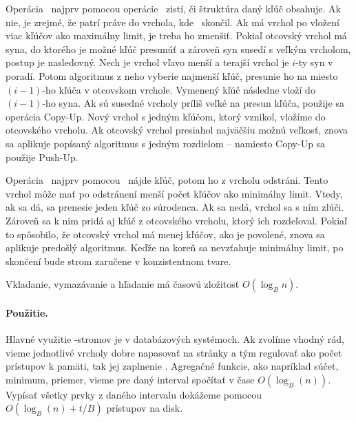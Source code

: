 Operácia \ins\ najprv pomocou operácie \find\ zistí, či štruktúra daný kľúč obsahuje.
Ak nie, je zrejmé, že patrí práve do vrchola, kde \find\ skončil. Ak má vrchol po vložení
viac kľúčov ako maximálny limit, je treba ho zmenšiť. Pokiaľ otcovský vrchol má syna,
do ktorého je možné kľúč presunúť a zároveň syn susedí s veľkým vrcholom, postup je nasledovný.
Nech je vrchol vľavo menší a terajší vrchol je $i$-ty syn v poradí. Potom algoritmus z neho
vyberie najmenší kľúč, presunie ho na miesto $(i-1)$-ho kľúča v otcovskom vrchole. Vymenený
kľúč následne vloží do $(i-1)$-ho syna. Ak sú susedné vrcholy príliš veľké na presun kľúča,
použije sa operácia {\sc Copy-Up}. Nový vrchol s jedným kľúčom, ktorý vznikol, vložíme do
otcovského vrcholu. Ak otcovský vrchol presiahol najväčšiu možnú veľkosť, znova sa aplikuje
popísaný algoritmus s jedným rozdielom -- namiesto {\sc Copy-Up} sa použije {\sc Push-Up}.

Operácia \delete\ najprv pomocou \find\ nájde kľúč, potom ho z vrcholu odstráni. Tento vrchol
môže mať po odstránení menší počet kľúčov ako minimálny limit. Vtedy, ak sa dá, sa prenesie
jeden kľúč zo súrodenca. Ak sa nedá, vrchol sa s ním zlúči. Zároveň sa k nim pridá aj kľúč
z otcovského vrcholu, ktorý ich rozdeľoval. Pokiaľ to spôsobilo, že otcovský vrchol má menej
kľúčov, ako je povolené, znova sa aplikuje predošlý algoritmus. Keďže na koreň sa nevzťahuje
minimálny limit, po skončení bude strom zaručene v konzistentnom tvare.

Vkladanie, vymazávanie a hľadanie má časovú zložitosť $O(\log_B n)$.

\paragraph{Použitie.}
Hlavné využitie \Bp-stromov je v databázových systémoch. Ak zvolíme vhodný rád, vieme jednotlivé
vrcholy dobre napasovať na stránky a tým regulovať ako počet prístupov k pamäti, tak jej zaplnenie
\citet{sahni}. Agregačné funkcie, ako napríklad súčet, minimum, priemer, vieme pre daný interval
spočítať v čase $O(\log_B(n))$. Vypísať všetky prvky z daného intervalu dokážeme pomocou
$O(\log_B(n) + t/B)$ prístupov na disk.


